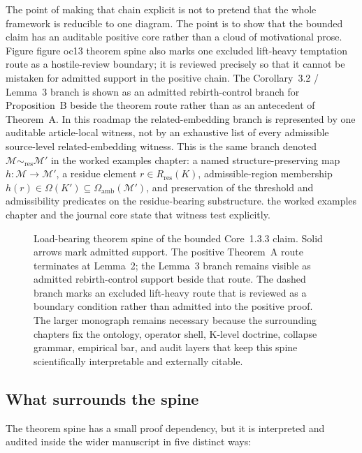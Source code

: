 The point of making that chain explicit is not to pretend that the whole
framework is reducible to one diagram. The point is to show that the bounded
claim has an auditable positive core rather than a cloud of motivational prose.
Figure figure oc13 theorem spine also marks one excluded lift-heavy
temptation route as a hostile-review boundary; it is reviewed precisely so that
it cannot be mistaken for admitted support in the positive chain. The
Corollary~3.2 / Lemma~3 branch is shown as an admitted rebirth-control branch
for Proposition~B beside the theorem route rather than as an antecedent of
Theorem~A. In this roadmap the related-embedding branch is represented by one
auditable article-local witness, not by an exhaustive list of every admissible
source-level related-embedding witness. This is the same branch denoted
\(\mathcal{M}\sim_{\mathrm{res}}\mathcal{M}'\) in
the worked examples chapter: a named structure-preserving map
\(h:\mathcal{M}\to\mathcal{M}'\), a residue element
\(r\in R_{\mathrm{res}}(K)\),
admissible-region membership
\(h(r)\in\Omega(K')\subseteq\Omega_{\mathrm{amb}}(\mathcal{M}')\),
and preservation of the threshold and admissibility predicates on the
residue-bearing substructure. the worked examples chapter and
the journal core state that witness test explicitly.

\begin{figure}[htbp]
\centering

\caption{Load-bearing theorem spine of the bounded Core~1.3.3 claim. Solid arrows
mark admitted support. The positive Theorem~A route terminates at Lemma~2; the
Lemma~3 branch remains visible as admitted rebirth-control support beside that
route. The dashed branch marks an excluded lift-heavy route that is reviewed as
a boundary condition rather than admitted into the positive proof. The larger
monograph remains necessary because the surrounding chapters fix the ontology,
operator shell, K-level doctrine, collapse grammar, empirical bar, and audit
layers that keep this spine scientifically interpretable and externally
citable.}
\label{fig:oc13-theorem-spine}
\end{figure}

\subsection{What surrounds the spine}

The theorem spine has a small proof dependency, but it is interpreted and
audited inside the wider manuscript in five distinct ways:

